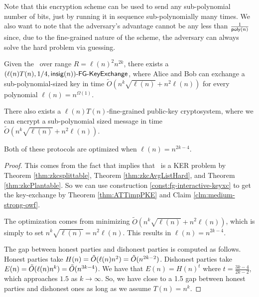 Note that this encryption scheme can be used to send any sub-polynomial number of bits, just by running it in sequence sub-polynomially many times. %
 We also want to note that the adversary's advantage cannot be any less than $\frac{1}{ \poly(n)}$ since, due to the fine-grained nature of the scheme, the adversary can always solve the hard problem via guessing.


\begin{corollary}
	Given the \strongzkc~over range $R = \ell(n)^2 n^{2k}$, there exists a\\ $\fgkeyxc{\ell(n)T(n)}{1/4}{\insig(n)}$, where Alice and Bob can exchange a sub-polynomial-sized key in time $\tilde{O}\left(n^{k}\sqrt{\ell(n)} + n^2\ell(n)\right)$ for every polynomial $\ell(n)= n ^{\Omega(1)}$.
	
	There also exists a $\ell(n)T(n)$-fine-grained public-key cryptosystem, where we can encrypt a sub-polynomial sized message in time $\tilde{O}\left(n^{k}\sqrt{\ell(n)} + n^2\ell(n)\right)$.
	
	Both of these protocols are optimized when $\ell(n) = n^{2k-4}$.
	\label{cor:kcliqueKeyExchange}
\end{corollary}
\begin{proof}
	This comes from the fact that \strongzkc implies that \zkclique~is a KER problem by Theorem \ref{thm:zkcsplittable}, Theorem \ref{thm:zkcAvgListHard}, and Theorem \ref{thm:zkcPlantable}.  So we can use construction \ref{const:fg-interactive-keyxc} to get the key-exchange by Theorem \ref{thm:ATTimpPKE} and Claim \ref{clm:medium-strong-owf}. %
	
	The optimization comes from minimizing $\tilde{O}\left(n^{k}\sqrt{\ell(n)} + n^2\ell(n)\right)$, which is simply to set $n^k \sqrt{\ell(n)} = n^2 \ell(n)$. This results in $\ell(n) = n^{2k - 4}$.
	
	The gap between honest parties and dishonest parties is computed as follows. Honest parties take $H(n) = \~O(\ell(n)n^2) = \~O(n^{2k - 2})$. Dishonest parties take $E(n) = \~O(\ell(n)n^k) = \~O(n^{3k - 4})$. We have that $E(n) = H(n)^t$ where $t = \frac{3k-4}{2k-2}$, which approaches $1.5$ as $k \to \infty$. So, we have close to a 1.5 gap between honest parties and dishonest ones as long as we assume $T(n) = n^{k}$.
\end{proof}

